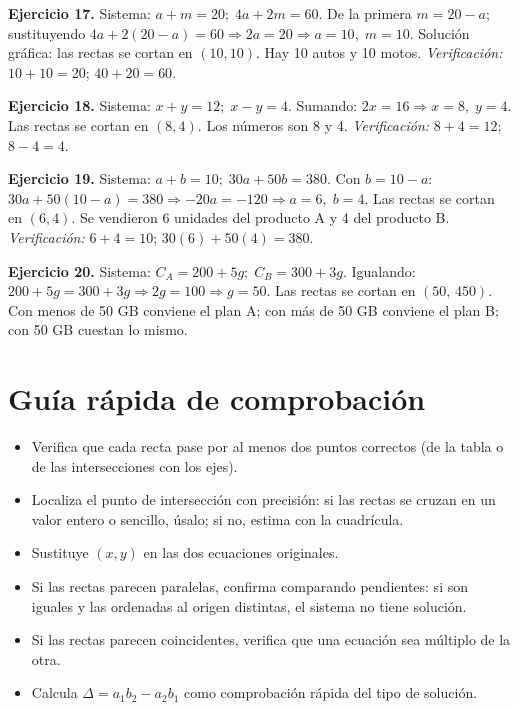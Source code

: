 \documentclass[12pt]{article}
\begin{document}
\textbf{Ejercicio 17.} Sistema: \(a+m=20;\; 4a+2m=60\). De la primera \(m=20-a\); sustituyendo \(4a+2(20-a)=60 \Rightarrow 2a=20 \Rightarrow a=10,\; m=10\). Solución gráfica: las rectas se cortan en \((10,10)\). Hay 10 autos y 10 motos. \textit{Verificación:} \(10+10=20\); \(40+20=60\). \checkmark

\textbf{Ejercicio 18.} Sistema: \(x+y=12;\; x-y=4\). Sumando: \(2x=16 \Rightarrow x=8,\; y=4\). Las rectas se cortan en \((8,4)\). Los números son 8 y 4. \textit{Verificación:} \(8+4=12\); \(8-4=4\). \checkmark

\textbf{Ejercicio 19.} Sistema: \(a+b=10;\; 30a+50b=380\). Con \(b=10-a\): \(30a+50(10-a)=380 \Rightarrow -20a=-120 \Rightarrow a=6,\; b=4\). Las rectas se cortan en \((6,4)\). Se vendieron 6 unidades del producto A y 4 del producto B. \textit{Verificación:} \(6+4=10\); \(30(6)+50(4)=380\). \checkmark

\textbf{Ejercicio 20.} Sistema: \(C_A=200+5g;\; C_B=300+3g\). Igualando: \(200+5g=300+3g \Rightarrow 2g=100 \Rightarrow g=50\). Las rectas se cortan en \((50,\,450)\). Con menos de 50 GB conviene el plan A; con más de 50 GB conviene el plan B; con 50 GB cuestan lo mismo.

\section{Guía rápida de comprobación}

\begin{itemize}
  \item Verifica que cada recta pase por al menos dos puntos correctos (de la tabla o de las intersecciones con los ejes).
  \item Localiza el punto de intersección con precisión: si las rectas se cruzan en un valor entero o sencillo, úsalo; si no, estima con la cuadrícula.
  \item Sustituye \((x,y)\) en las dos ecuaciones originales.
  \item Si las rectas parecen paralelas, confirma comparando pendientes: si son iguales y las ordenadas al origen distintas, el sistema no tiene solución.
  \item Si las rectas parecen coincidentes, verifica que una ecuación sea múltiplo de la otra.
  \item Calcula \(\Delta=a_1b_2-a_2b_1\) como comprobación rápida del tipo de solución.
\end{itemize}
\end{document}

